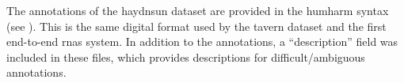 
The annotations of the \gls{haydnsun} dataset are provided
in the \gls{humharm} syntax (see
). This is the same digital
format used by the \gls{tavern} dataset and the first
end-to-end \glspl{rna} system. In addition to the
annotations, a ``description'' field was included in these
files, which provides descriptions for difficult/ambiguous
annotations.

